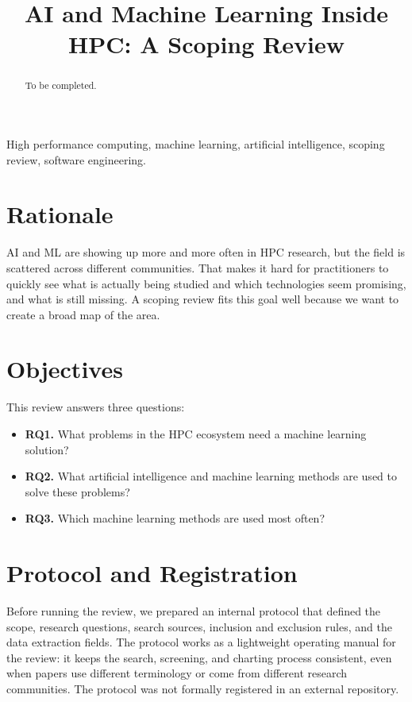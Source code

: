 \documentclass[journal]{IEEEtran}
\title{AI and Machine Learning Inside HPC: A Scoping Review}
\author{}
\begin{document}
\maketitle

\begin{abstract}
To be completed.
\end{abstract}

\begin{IEEEkeywords}
High performance computing, machine learning, artificial intelligence, scoping review, software engineering.
\end{IEEEkeywords}

\section{Rationale}

AI and ML are showing up more and more often in HPC research, but the field is scattered across different communities. That makes it hard for practitioners to quickly see what is actually being studied and which technologies seem promising, and what is still missing. A scoping review fits this goal well because we want to create a broad map of the area.

\section{Objectives}

This review answers three questions:

\begin{itemize}
    \item \textbf{RQ1.} What problems in the HPC ecosystem need a machine learning solution?
    \item \textbf{RQ2.} What artificial intelligence and machine learning methods are used to solve these problems?
    \item \textbf{RQ3.} Which machine learning methods are used most often?
\end{itemize}

\section{Protocol and Registration}

Before running the review, we prepared an internal protocol that defined the scope, research questions, search sources, inclusion and exclusion rules, and the data extraction fields. The protocol works as a lightweight operating manual for the review: it keeps the search, screening, and charting process consistent, even when papers use different terminology or come from different research communities. The protocol was not formally registered in an external repository.
\end{document}
